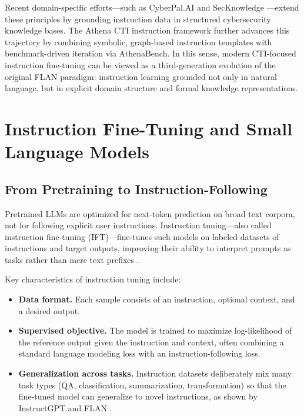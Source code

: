 \documentclass[unnumsec,webpdf,contemporary,large]{oup-authoring-template}
\theoremstyle{thmstyleone}
\theoremstyle{thmstyletwo}
\theoremstyle{thmstylethree}
\begin{document}
Recent domain-specific efforts---such as CyberPal.AI and SecKnowledge \cite{levi2024cyberpal,levi2025toward}---extend these principles by grounding instruction data in structured cybersecurity knowledge bases. The Athena CTI instruction framework further advances this trajectory by combining symbolic, graph-based instruction templates with benchmark-driven iteration via AthenaBench. In this sense, modern CTI-focused instruction fine-tuning can be viewed as a third-generation evolution of the original FLAN paradigm: instruction learning grounded not only in natural language, but in explicit domain structure and formal knowledge representations.


\section{Instruction Fine-Tuning and Small Language Models}
\label{sec:ift-slm}

\subsection{From Pretraining to Instruction-Following}

Pretrained LLMs are optimized for next-token prediction on broad text corpora, not for following explicit user instructions. Instruction tuning---also called instruction fine-tuning (IFT)---fine-tunes such models on labeled datasets of instructions and target outputs, improving their ability to interpret prompts as tasks rather than mere text prefixes \cite{wei2022flan,ouyang2022instructgpt}.

Key characteristics of instruction tuning include:

\begin{itemize}
  \item \textbf{Data format.} Each sample consists of an instruction, optional context, and a desired output.
  \item \textbf{Supervised objective.} The model is trained to maximize log-likelihood of the reference output given the instruction and context, often combining a standard language modeling loss with an instruction-following loss.
  \item \textbf{Generalization across tasks.} Instruction datasets deliberately mix many task types (QA, classification, summarization, transformation) so that the fine-tuned model can generalize to novel instructions, as shown by InstructGPT and FLAN \cite{wei2022flan,ouyang2022instructgpt}.
\end{itemize}
\end{document}

